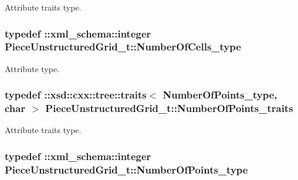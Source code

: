Attribute traits type. 

\hypertarget{classPieceUnstructuredGrid__t_aeae5546900c50a4abe9b3aea485e97d0}{
\subsubsection[{Number\-Of\-Cells\-\_\-type}]{\setlength{\rightskip}{0pt plus 5cm}typedef \-::{\bf xml\-\_\-schema\-::integer} {\bf Piece\-Unstructured\-Grid\-\_\-t\-::\-Number\-Of\-Cells\-\_\-type}}}\label{classPieceUnstructuredGrid__t_aeae5546900c50a4abe9b3aea485e97d0}


Attribute type. 

\hypertarget{classPieceUnstructuredGrid__t_acdfbb1dc264a5a48bcc6d4aa815db003}{
\subsubsection[{Number\-Of\-Points\-\_\-traits}]{\setlength{\rightskip}{0pt plus 5cm}typedef \-::xsd\-::cxx\-::tree\-::traits$<$ {\bf Number\-Of\-Points\-\_\-type}, char $>$ {\bf Piece\-Unstructured\-Grid\-\_\-t\-::\-Number\-Of\-Points\-\_\-traits}}}\label{classPieceUnstructuredGrid__t_acdfbb1dc264a5a48bcc6d4aa815db003}


Attribute traits type. 

\hypertarget{classPieceUnstructuredGrid__t_a8df1cd0d138d990e166d325ceed9a660}{
\subsubsection[{Number\-Of\-Points\-\_\-type}]{\setlength{\rightskip}{0pt plus 5cm}typedef \-::{\bf xml\-\_\-schema\-::integer} {\bf Piece\-Unstructured\-Grid\-\_\-t\-::\-Number\-Of\-Points\-\_\-type}}}\label{classPieceUnstructuredGrid__t_a8df1cd0d138d990e166d325ceed9a660}


